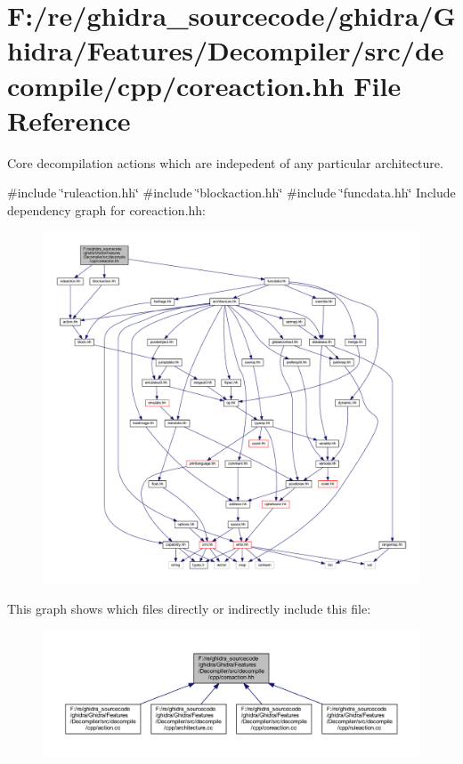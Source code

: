 \hypertarget{coreaction_8hh}{}\section{F\+:/re/ghidra\+\_\+sourcecode/ghidra/\+Ghidra/\+Features/\+Decompiler/src/decompile/cpp/coreaction.hh File Reference}
\label{coreaction_8hh}


Core decompilation actions which are indepedent of any particular architecture.  


{\ttfamily \#include \char`\"{}ruleaction.\+hh\char`\"{}}\newline
{\ttfamily \#include \char`\"{}blockaction.\+hh\char`\"{}}\newline
{\ttfamily \#include \char`\"{}funcdata.\+hh\char`\"{}}\newline
Include dependency graph for coreaction.\+hh\+:
\nopagebreak
\begin{figure}[H]
\begin{center}
\leavevmode
\includegraphics[width=350pt]{coreaction_8hh__incl}
\end{center}
\end{figure}
This graph shows which files directly or indirectly include this file\+:
\nopagebreak
\begin{figure}[H]
\begin{center}
\leavevmode
\includegraphics[width=350pt]{coreaction_8hh__dep__incl}
\end{center}
\end{figure}
